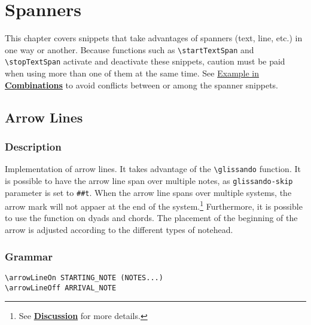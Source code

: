 
\chapter {Spanners}

This chapter covers snippets that take advantages of spanners (text, line, etc.) in one way or another. Because functions such as \verb|\startTextSpan| and \verb|\stopTextSpan| activate and deactivate these snippets, caution must be paid when using more than one of them at the same time. See \hyperref[sec:comb_spanners]{Example in \textbf{Combinations}} to avoid conflicts between or among the spanner snippets.
\clearpage
\section {Arrow Lines}
\label{sec:arrow_lines}
\hfill

\subsection{Description}
Implementation of arrow lines. It takes advantage of the \verb|\glissando| function. It is possible to have the arrow line span over multiple notes, as \verb|glissando-skip| parameter is set to \verb|##t|. When the arrow line spans over multiple systems, the arrow mark will not appaer at the end of the system.\footnote{See \hyperref[sec:arrow_lines_discussion]{\textbf{Discussion}} for more details.} Furthermore, it is possible to use the function on dyads and chords. The placement of the beginning of the arrow is adjusted according to the different types of notehead. 
\subsection{Grammar}
\begin{verbatim}
\arrowLineOn STARTING_NOTE (NOTES...)
\arrowLineOff ARRIVAL_NOTE
\end{verbatim}



